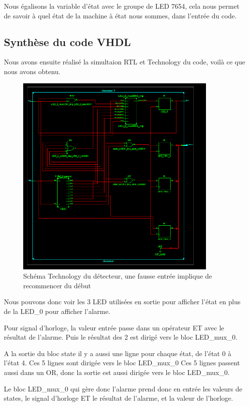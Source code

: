 \documentclass[11pt]{report}
\begin{document}
Nous égalisons la variable d'état avec le groupe de LED 7654, cela nous permet de savoir à quel état de la machine à état nous sommes, dans l'entrée du code.


\subsection{ Synthèse du code VHDL }


Nous avons ensuite réalisé la simultaion RTL et Technology du code, voilà ce que nous avons obtenu.



\begin{figure}[!h]
\includegraphics[width=10cm]{TP02-9.PNG}
\caption{Schéma Technology du détecteur, une fausse entrée implique de recommencer du début}
\end{figure}


Nous pouvons donc voir les 3 LED utilisées en sortie pour afficher l'état en plus de la LED\_0 pour afficher l'alarme.

Pour signal d'horloge, la valeur entrée passe dans un opérateur ET avec le résultat de l'alarme. Puis le résultat des 2 est dirigé vers le bloc LED\_mux\_0.


A la sortie du bloc state il y a aussi une ligne pour chaque état, de l'état 0 à l'état 4. Ces 5 lignes sont dirigée vers le bloc LED\_mux\_0
Ces 5 lignes passent aussi dans un OR, donc la sortie est aussi dirigée vers le bloc LED\_mux\_0.

Le bloc LED\_mux\_0 qui gère donc l'alarme prend donc en entrée les valeurs de states, le signal d'horloge ET le résultat de l'alarme, et la valeur de l'horloge.
\end{document}
